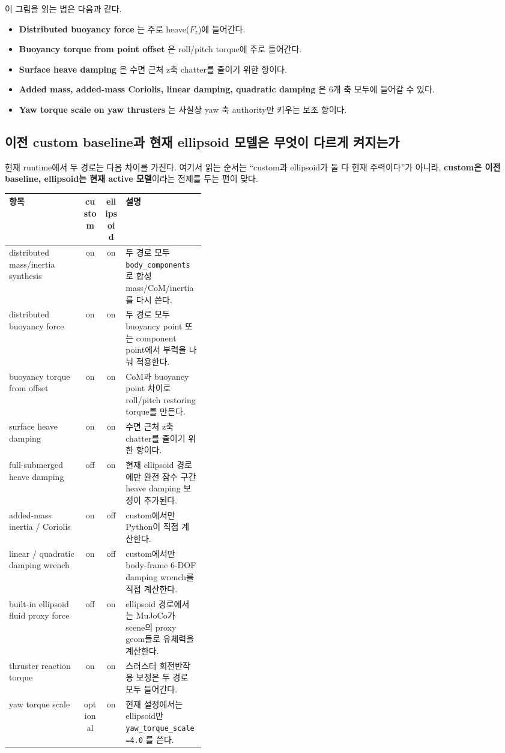 \documentclass[11pt,a4paper]{article}
\newcommand{\code}[1]{\nolinkurl{#1}}
\begin{document}
이 그림을 읽는 법은 다음과 같다.

\begin{itemize}[leftmargin=2em]
  \item \textbf{Distributed buoyancy force} 는 주로 heave($F_z$)에 들어간다.
  \item \textbf{Buoyancy torque from point offset} 은 roll/pitch torque에 주로 들어간다.
  \item \textbf{Surface heave damping} 은 수면 근처 z축 chatter를 줄이기 위한 항이다.
  \item \textbf{Added mass, added-mass Coriolis, linear damping, quadratic damping} 은 6개 축 모두에 들어갈 수 있다.
  \item \textbf{Yaw torque scale on yaw thrusters} 는 사실상 yaw 축 authority만 키우는 보조 항이다.
\end{itemize}

\subsection{이전 custom baseline과 현재 ellipsoid 모델은 무엇이 다르게 켜지는가}

현재 runtime에서 두 경로는 다음 차이를 가진다. 여기서 읽는 순서는 ``custom과 ellipsoid가 둘 다 현재 주력이다''가 아니라, \textbf{custom은 이전 baseline, ellipsoid는 현재 active 모델}이라는 전제를 두는 편이 맞다.

\begin{center}
\small
\begin{tabularx}{\linewidth}{>{\raggedright\arraybackslash}p{0.38\linewidth}ccY}
\toprule
항목 & custom & ellipsoid & 설명 \\
\midrule
distributed mass/inertia synthesis & on & on & 두 경로 모두 \code{body\_components} 로 합성 mass/CoM/inertia를 다시 쓴다. \\
distributed buoyancy force & on & on & 두 경로 모두 buoyancy point 또는 component point에서 부력을 나눠 적용한다. \\
buoyancy torque from offset & on & on & CoM과 buoyancy point 차이로 roll/pitch restoring torque를 만든다. \\
surface heave damping & on & on & 수면 근처 z축 chatter를 줄이기 위한 항이다. \\
full-submerged heave damping & off & on & 현재 ellipsoid 경로에만 완전 잠수 구간 heave damping 보정이 추가된다. \\
added-mass inertia / Coriolis & on & off & custom에서만 Python이 직접 계산한다. \\
linear / quadratic damping wrench & on & off & custom에서만 body-frame 6-DOF damping wrench를 직접 계산한다. \\
built-in ellipsoid fluid proxy force & off & on & ellipsoid 경로에서는 MuJoCo가 scene의 proxy geom들로 유체력을 계산한다. \\
thruster reaction torque & on & on & 스러스터 회전반작용 보정은 두 경로 모두 들어간다. \\
yaw torque scale & optional & on & 현재 설정에서는 ellipsoid만 \code{yaw\_torque\_scale=4.0} 를 쓴다. \\
\bottomrule
\end{tabularx}
\end{center}
\end{document}
